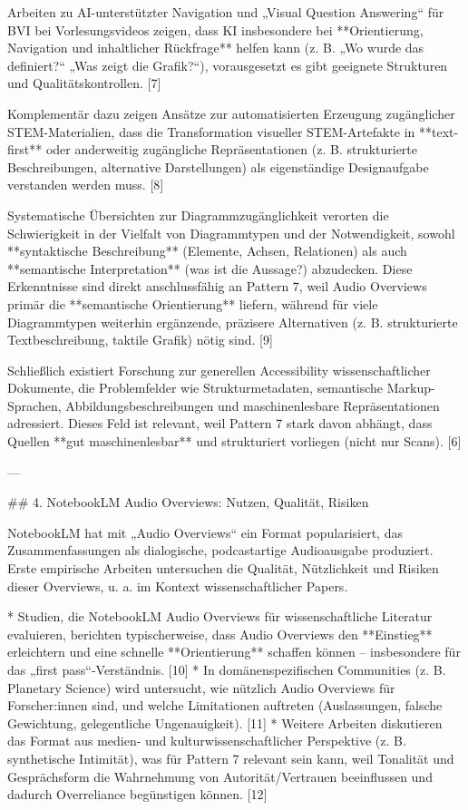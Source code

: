 Arbeiten zu AI-unterstützter Navigation und „Visual Question Answering“ für BVI bei Vorlesungsvideos zeigen, dass KI insbesondere bei **Orientierung, Navigation und inhaltlicher Rückfrage** helfen kann (z. B. „Wo wurde das definiert?“ „Was zeigt die Grafik?“), vorausgesetzt es gibt geeignete Strukturen und Qualitätskontrollen. [7]

Komplementär dazu zeigen Ansätze zur automatisierten Erzeugung zugänglicher STEM-Materialien, dass die Transformation visueller STEM-Artefakte in **text-first** oder anderweitig zugängliche Repräsentationen (z. B. strukturierte Beschreibungen, alternative Darstellungen) als eigenständige Designaufgabe verstanden werden muss. [8]

Systematische Übersichten zur Diagrammzugänglichkeit verorten die Schwierigkeit in der Vielfalt von Diagrammtypen und der Notwendigkeit, sowohl **syntaktische Beschreibung** (Elemente, Achsen, Relationen) als auch **semantische Interpretation** (was ist die Aussage?) abzudecken. Diese Erkenntnisse sind direkt anschlussfähig an Pattern 7, weil Audio Overviews primär die **semantische Orientierung** liefern, während für viele Diagrammtypen weiterhin ergänzende, präzisere Alternativen (z. B. strukturierte Textbeschreibung, taktile Grafik) nötig sind. [9]

Schließlich existiert Forschung zur generellen Accessibility wissenschaftlicher Dokumente, die Problemfelder wie Strukturmetadaten, semantische Markup-Sprachen, Abbildungsbeschreibungen und maschinenlesbare Repräsentationen adressiert. Dieses Feld ist relevant, weil Pattern 7 stark davon abhängt, dass Quellen **gut maschinenlesbar** und strukturiert vorliegen (nicht nur Scans). [6]

---

## 4. NotebookLM Audio Overviews: Nutzen, Qualität, Risiken

NotebookLM hat mit „Audio Overviews“ ein Format popularisiert, das Zusammenfassungen als dialogische, podcastartige Audioausgabe produziert. Erste empirische Arbeiten untersuchen die Qualität, Nützlichkeit und Risiken dieser Overviews, u. a. im Kontext wissenschaftlicher Papers.

* Studien, die NotebookLM Audio Overviews für wissenschaftliche Literatur evaluieren, berichten typischerweise, dass Audio Overviews den **Einstieg** erleichtern und eine schnelle **Orientierung** schaffen können – insbesondere für das „first pass“-Verständnis. [10]
* In domänenspezifischen Communities (z. B. Planetary Science) wird untersucht, wie nützlich Audio Overviews für Forscher:innen sind, und welche Limitationen auftreten (Auslassungen, falsche Gewichtung, gelegentliche Ungenauigkeit). [11]
* Weitere Arbeiten diskutieren das Format aus medien- und kulturwissenschaftlicher Perspektive (z. B. synthetische Intimität), was für Pattern 7 relevant sein kann, weil Tonalität und Gesprächsform die Wahrnehmung von Autorität/Vertrauen beeinflussen und dadurch Overreliance begünstigen können. [12]

